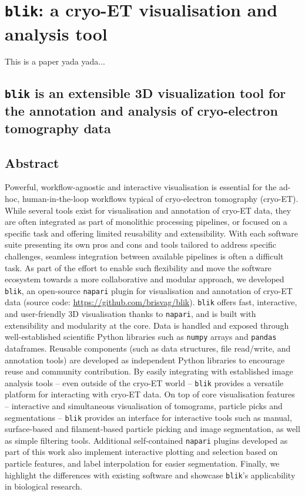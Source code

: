 \chapter{\texttt{blik}: a cryo-ET visualisation and analysis tool}

This is a paper yada yada...

\section*{\texttt{blik} is an extensible 3D visualization tool for the annotation and analysis of cryo-electron tomography data}

\localtableofcontents

\section{Abstract}
Powerful, workflow-agnostic and interactive visualisation is essential for the ad-hoc, human-in-the-loop workflows typical of cryo-electron tomography (cryo-ET). While several tools exist for visualisation and annotation of cryo-ET data, they are often integrated as part of monolithic processing pipelines, or focused on a specific task and offering limited reusability and extensibility. With each software suite presenting its own pros and cons and tools tailored to address specific challenges, seamless integration between available pipelines is often a difficult task.
As part of the effort to enable such flexibility and move the software ecosystem towards a more collaborative and modular approach, we developed \texttt{blik}, an open-source \texttt{napari} plugin for visualisation and annotation of cryo-ET data (source code: \url{https://github.com/brisvag/blik}).
\texttt{blik} offers fast, interactive, and user-friendly 3D visualisation thanks to \texttt{napari}, and is built with extensibility and modularity at the core. Data is handled and exposed through well-established scientific Python libraries such as \texttt{numpy} arrays and \texttt{pandas} dataframes. Reusable components (such as data structures, file read/write, and annotation tools) are developed as independent Python libraries to encourage reuse and community contribution. By easily integrating with established image analysis tools -- even outside of the cryo-ET world -- \texttt{blik} provides a versatile platform for interacting with cryo-ET data.
On top of core visualisation features -- interactive and simultaneous visualisation of tomograms, particle picks and segmentations -- \texttt{blik} provides an interface for interactive tools such as manual, surface-based and filament-based particle picking and image segmentation, as well as simple filtering tools. Additional self-contained \texttt{napari} plugins developed as part of this work also implement interactive plotting and selection based on particle features, and label interpolation for easier segmentation.
Finally, we highlight the differences with existing software and showcase \texttt{blik}'s applicability in biological research.

